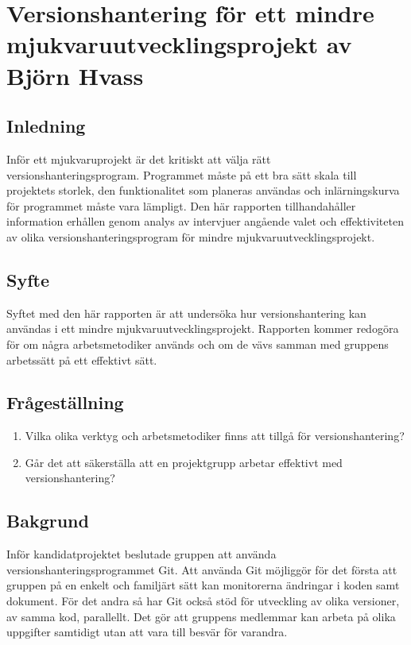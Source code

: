 \chapter{Versionshantering för ett mindre mjukvaruutvecklingsprojekt av Björn Hvass}

\section{Inledning}
Inför ett mjukvaruprojekt är det kritiskt att välja rätt versionshanteringsprogram. Programmet måste på ett bra sätt skala till projektets storlek, den funktionalitet som planeras användas och inlärningskurva för programmet måste vara lämpligt. Den här rapporten tillhandahåller information erhållen genom analys av intervjuer angående valet och effektiviteten av olika versionshanteringsprogram för mindre mjukvaruutvecklingsprojekt.

\section{Syfte}
Syftet med den här rapporten är att undersöka hur versionshantering kan användas i ett mindre mjukvaruutvecklingsprojekt. Rapporten kommer redogöra för om några arbetsmetodiker används och om de vävs samman med gruppens arbetssätt på ett effektivt sätt.

\section{Frågeställning}
\begin{enumerate}
    \item Vilka olika verktyg och arbetsmetodiker finns att tillgå för versionshantering?
    \item Går det att säkerställa att en projektgrupp arbetar effektivt med versionshantering?
\end{enumerate}

\section{Bakgrund}
Inför kandidatprojektet beslutade gruppen att använda versionshanteringsprogrammet Git. Att använda Git möjliggör för det första att gruppen på en enkelt och familjärt sätt kan monitorerna ändringar i koden samt dokument. För det andra så har Git också stöd för utveckling av olika versioner, av samma kod, parallellt. Det gör att gruppens medlemmar kan arbeta på olika uppgifter samtidigt utan att vara till besvär för varandra.


